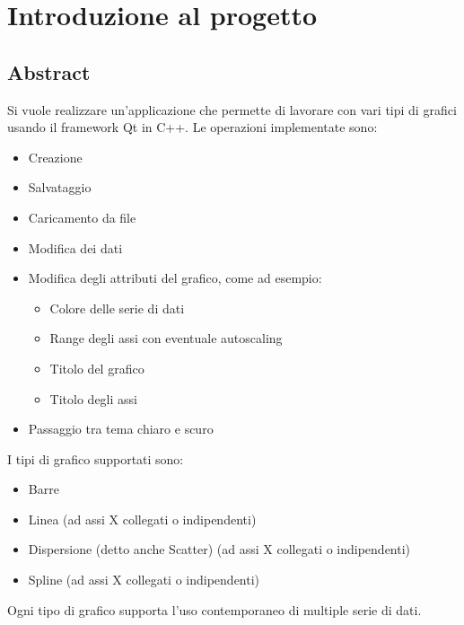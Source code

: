 \section{Introduzione al progetto}
\subsection{Abstract}
Si vuole realizzare un'applicazione che permette di lavorare con vari tipi di grafici usando il framework Qt in C++.
Le operazioni implementate sono:
\begin{itemize}
    \item Creazione
    \item Salvataggio
    \item Caricamento da file
    \item Modifica dei dati
    \item Modifica degli attributi del grafico, come ad esempio:
    \begin{itemize}
        \item Colore delle serie di dati
        \item Range degli assi con eventuale autoscaling
        \item Titolo del grafico
        \item Titolo degli assi
    \end{itemize}
    \item Passaggio tra tema chiaro e scuro
\end{itemize}
I tipi di grafico supportati sono:
\begin{itemize}
    \item Barre
    \item Linea (ad assi X collegati o indipendenti)
    \item Dispersione (detto anche Scatter) (ad assi X collegati o indipendenti)
    \item Spline (ad assi X collegati o indipendenti)
\end{itemize}
Ogni tipo di grafico supporta l'uso contemporaneo di multiple serie di dati.
